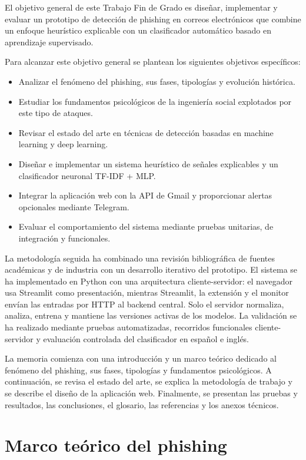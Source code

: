 \documentclass[11pt,a4paper,oneside]{report}
\begin{document}
El objetivo general de este Trabajo Fin de Grado es diseñar, implementar y evaluar un prototipo de detección de phishing en correos electrónicos que combine un enfoque heurístico explicable con un clasificador automático basado en aprendizaje supervisado.

Para alcanzar este objetivo general se plantean los siguientes objetivos específicos:

\begin{itemize}
  \item Analizar el fenómeno del phishing, sus fases, tipologías y evolución histórica.
  \item Estudiar los fundamentos psicológicos de la ingeniería social explotados por este tipo de ataques.
  \item Revisar el estado del arte en técnicas de detección basadas en machine learning y deep learning.
  \item Diseñar e implementar un sistema heurístico de señales explicables y un clasificador neuronal TF-IDF + MLP.
  \item Integrar la aplicación web con la API de Gmail y proporcionar alertas opcionales mediante Telegram.
  \item Evaluar el comportamiento del sistema mediante pruebas unitarias, de integración y funcionales.
\end{itemize}

La metodología seguida ha combinado una revisión bibliográfica de fuentes académicas y de industria con un desarrollo iterativo del prototipo. El sistema se ha implementado en Python con una arquitectura cliente-servidor: el navegador usa Streamlit como presentación, mientras Streamlit, la extensión y el monitor envían las entradas por HTTP al backend central. Solo el servidor normaliza, analiza, entrena y mantiene las versiones activas de los modelos. La validación se ha realizado mediante pruebas automatizadas, recorridos funcionales cliente-servidor y evaluación controlada del clasificador en español e inglés.

La memoria comienza con una introducción y un marco teórico dedicado al fenómeno del phishing, sus fases, tipologías y fundamentos psicológicos. A continuación, se revisa el estado del arte, se explica la metodología de trabajo y se describe el diseño de la aplicación web. Finalmente, se presentan las pruebas y resultados, las conclusiones, el glosario, las referencias y los anexos técnicos.

\chapter{Marco teórico del phishing}
\end{document}
